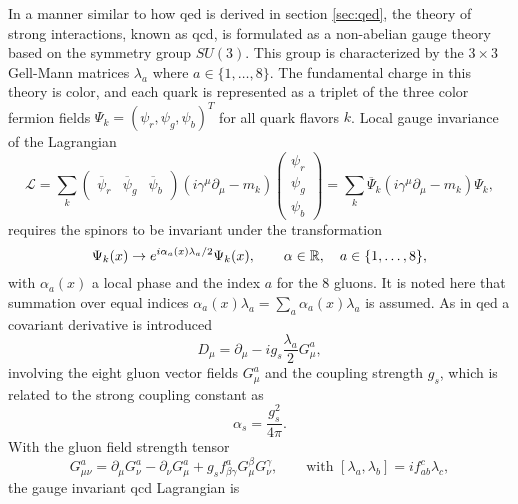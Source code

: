 In a manner similar to how \ac{qed} is derived in section \ref{sec:qed}, the theory of strong interactions, known as \ac{qcd}, is formulated as a non-abelian gauge theory based on the symmetry group $SU(3)$. This group is characterized by the $3\times 3$ Gell-Mann matrices $\lambda_a$ where $a\in\{1,\ldots,8\}$. The fundamental charge in this theory is color, and each quark is represented as a triplet of the three color fermion fields $\Psi_k=(\psi_r,\psi_g,\psi_b)^T$ for all quark flavors $k$. Local gauge invariance of the Lagrangian
\begin{equation}
    \mathcal{L} =
    \sum_k
    \begin{pmatrix}
        \overline{\psi}_r & \overline{\psi}_g & \overline{\psi}_b
    \end{pmatrix}
    (i \gamma^\mu \partial_\mu - m_k )
    \begin{pmatrix}
        \psi_r \\
        \psi_g \\
        \psi_b
    \end{pmatrix}
    =
    \sum_k
    \overline{\Psi}_k(i \gamma^\mu \partial_\mu - m_k )\Psi_k,
    \label{eq:dirac}
\end{equation}
requires the spinors to be invariant under the transformation
\begin{equation}
    \Psi_k(x) \rightarrow e^{i \alpha_a(x) \lambda_a/2} \Psi_k(x),\qquad \alpha\in\mathbb{R},\quad a\in\{1,\mathellipsis,8\},
\end{equation}
with $\alpha_a(x)$ a local phase and the index $a$ for the 8 gluons. It is noted here that summation over equal indices $\alpha_a(x) \lambda_a=\sum_a \alpha_a(x) \lambda_a$ is assumed. As in \ac{qed} a covariant derivative is introduced
\begin{equation}
    D_\mu = \partial_\mu - i g_s \frac{\lambda_a}{2}G_\mu^a,
\end{equation}
involving the eight gluon vector fields $G_\mu^a$ and the coupling strength $g_s$, which is related to the strong coupling constant as
\begin{equation}
    \alpha_s=\frac{g_s^2}{4\pi}.
\end{equation}
With the gluon field strength tensor
\begin{equation}
    G^a_{\mu\nu}=\partial_\mu G_\nu^a-\partial_\nu G_\mu^a+g_s f^a_{\beta\gamma}G^\beta_\mu G_\nu^\gamma, \qquad \text{with } [\lambda_a,\lambda_b]= i f_{ab}^c \lambda_c,
\end{equation}
the gauge invariant \ac{qcd} Lagrangian is
